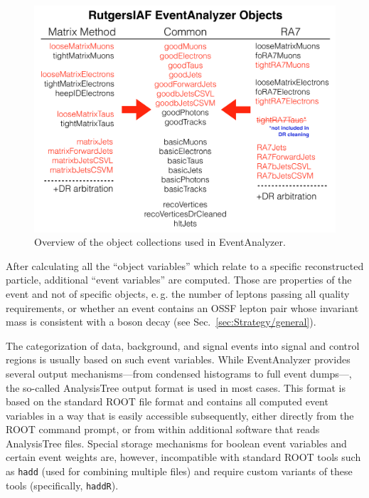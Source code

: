 \begin{figure}
\begin{center}
	\includegraphics[width=\textwidth]{Appendix/EventAnalyzer}
	\caption{Overview of the object collections used in EventAnalyzer.
	\label{fig:EventAnalyzer}}
\end{center}
\end{figure}

After calculating all the ``object variables'' which relate to a specific reconstructed particle, additional ``event variables'' are computed. Those are properties of the event and not of specific objects, e.\,g. the number of leptons passing all quality requirements, or whether an event contains an OSSF lepton pair whose invariant mass is consistent with a \Z boson decay (see Sec.~\ref{sec:Strategy/general}).

The categorization of data, background, and signal events into signal and control regions is usually based on such event variables. While EventAnalyzer provides several output mechanisms\hairspace{}---\hairspace{}from condensed histograms to full event dumps\hairspace{}---, the so-called AnalysisTree output format is used in most cases. This format is based on the standard ROOT file format and contains all computed event variables in a way that is easily accessible subsequently, either directly from the ROOT command prompt, or from within additional software that reads AnalysisTree files. Special storage mechanisms for boolean event variables and certain event weights are, however, incompatible with standard ROOT tools such as \texttt{hadd} (used for combining multiple files) and require custom variants of these tools (specifically, \texttt{haddR}).

